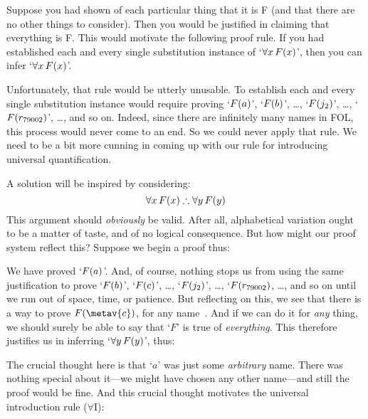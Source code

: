 Suppose you had shown of each particular thing that it is F (and that there are no other things to consider). Then you would be justified in claiming that everything is F. This would motivate the following proof rule. If you had established each and every single substitution instance of `$\forall x\,F(x)$', then you can infer `$\forall x\,F(x)$'.

Unfortunately, that rule would be utterly unusable. To establish each and every single substitution instance would require proving `$F(a)$', `$F(b)$', \dots, `$F(j_2)$', \dots, `$F(r_{79002})$', \ldots, and so on. Indeed, since there are infinitely many names in FOL, this process would never come to an end. So we could never apply that rule. We need to be a bit more cunning in coming up with our rule for introducing universal quantification.

A solution will be inspired by considering:
$$\forall x\,\atom{F}{x} \therefore \forall y\,\atom{F}{y}$$
This argument should \emph{obviously} be valid. After all, alphabetical variation ought to be a matter of taste, and of no logical consequence. But how might our proof system reflect this? Suppose we begin a proof thus:
\begin{fitchproof}
	 \PR
	 
\end{fitchproof}
We have proved `$F(a)$'. And, of course, nothing stops us from using the same justification to prove `$F(b)$', `$F(c)$', \ldots, `$F(j_2)$', \ldots, `$F(r_{79002})$, \dots, and so on until we run out of space, time, or patience. But reflecting on this, we see that there is a way to prove $\atom{F}{\metav{c}}$, for any name~. And if we can do it for \emph{any} thing, we should surely be able to say that `$F$' is true of \emph{everything}. This therefore justifies us in inferring `$\forall y\,F(y)$', thus:
\begin{fitchproof}
	\PR
	 
	 
\end{fitchproof}
The crucial thought here is that `$a$' was just some \emph{arbitrary} name. There was nothing special about it---we might have chosen any other name---and still the proof would be fine. And this crucial thought motivates the universal introduction rule ($\forall$I):

